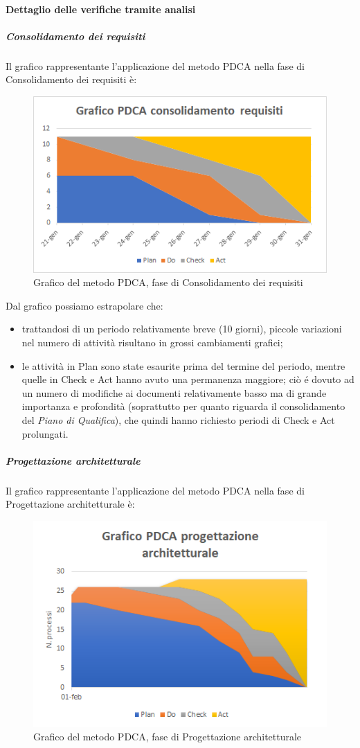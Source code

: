 \paragraph{Dettaglio delle verifiche tramite analisi}
\subparagraph{Consolidamento dei requisiti}\MiniSpazio
Il grafico rappresentante l'applicazione del metodo PDCA nella fase di Consolidamento dei requisiti è:
\begin{figure} [H]
	\centering
	\includegraphics[scale=1]{Img/Grafico_PDCA_consolidamento_requisiti}
	\caption{Grafico del metodo PDCA, fase di Consolidamento dei requisiti}\label{}
\end{figure}
Dal grafico possiamo estrapolare che:
\begin{itemize}
	\item trattandosi di un periodo relativamente breve (10 giorni), piccole variazioni nel numero di attività risultano in grossi cambiamenti grafici;
	\item le attività in Plan sono state esaurite prima del termine del periodo, mentre quelle in Check e Act hanno avuto una permanenza maggiore; ciò é dovuto ad un numero di modifiche ai documenti relativamente basso ma di grande importanza e profondità (soprattutto per quanto riguarda il consolidamento del \emph{Piano di Qualifica}), che quindi hanno richiesto periodi di Check e Act prolungati.
\end{itemize}
\subparagraph{Progettazione architetturale}\MiniSpazio
Il grafico rappresentante l'applicazione del metodo PDCA nella fase di Progettazione architetturale è:
\begin{figure} [H]
	\centering
	\includegraphics[scale=1]{Img/Grafico_PDCA_progettazione_architetturale}
	\caption{Grafico del metodo PDCA, fase di Progettazione architetturale}\label{}
\end{figure}
